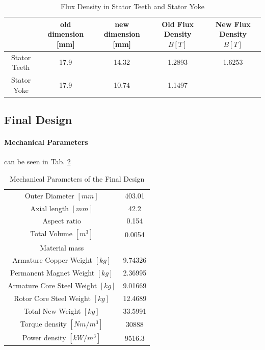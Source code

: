 \documentclass [a4 paper, 11pt, titlepage] {article}
\begin{document}
	\begin{table}[h]
		\begin{center}
			\begin{tabular}{c|c|c|c|c}
				& old dimension [mm] & new dimension [mm] & Old Flux Density $B [T]$ & New Flux Density $B [T]$ \\
				\hline
				Stator Teeth & 17.9 & 14.32 & 1.2893 & 1.6253 \\
				\hline\hline
				Stator Yoke & 17.9 & 10.74 & 1.1497 \\
			\end{tabular}
		\end{center}
		\caption{Flux Density in Stator Teeth and Stator Yoke \cite{pyrhonen_design_2014}}
		\label{tab:fluxDensityinCrit.1}
	\end{table}
	
	\subsection{Final Design}
	
	\paragraph{Mechanical Parameters} can be seen in Tab. \ref{tab:finalMechPara}
	
	\begin{table}[h]
		\begin{center}
			\begin{tabular}{c|c}
				Outer Diameter $[mm]$ & 403.01 \\
				Axial length $[mm]$ & 42.2 \\
				Aspect ratio & 0.154 \\
				Total Volume $[m^3]$ & 0.0054 \\
				\hline\hline
				Material mass & \\
				Armature Copper Weight $[kg]$ & 9.74326 \\
				Permanent Magnet Weight $[kg]$ & 2.36995 \\
				Armature Core Steel Weight $[kg]$ & 9.01669 \\
				Rotor Core Steel Weight $[kg]$ & 12.4689 \\
				Total New Weight $[kg]$ & 33.5991 \\
				\hline\hline
				Torque density $[Nm/m^3]$ & 30888 \\
				Power density $[kW/m^3]$ & 9516.3 \\
			\end{tabular}
		\end{center}
		\caption{Mechanical Parameters of the Final Design}
		\label{tab:finalMechPara}
	\end{table}
	
\end{document}
